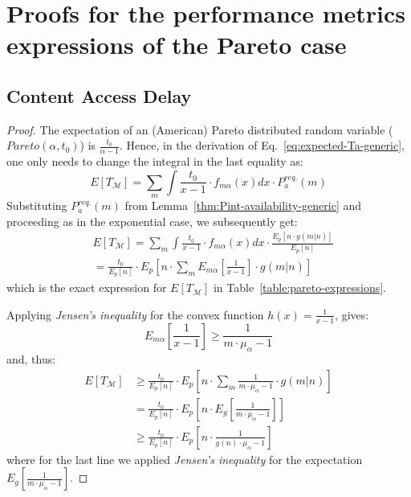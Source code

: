 \documentclass[journal]{IEEEtran}
\newcommand{\eq}[1]{Eq.~\eqref{#1}}
\begin{document}
\section{Proofs for the performance metrics expressions of the Pareto case}\label{appendix:pareto-expressions-proofs}
\subsection{Content Access Delay}
\begin{proof}
The expectation of an (American) Pareto distributed random variable ($Pareto(\alpha, t_{0})$) is $\frac{t_{0}}{\alpha-1}$. Hence, in the derivation of \eq{eq:expected-Ta-generic}, one only needs to change the integral in the last equality as:
\begin{equation}\label{eq:expected-Ta-generic-pareto}
E[T_{\mathcal{M}}] = \sum_{m} \int \frac{t_{0}}{x-1}\cdot f_{m\alpha}(x)dx \cdot P_{a}^{req.}(m)
\end{equation}
Substituting $P_{a}^{req.}(m)$ from Lemma~\ref{thm:Pint-availability-generic} and proceeding as in the exponential case, we subsequently get:
\begin{align}
&E[T_{\mathcal{M}}] = \sum_{m} \int \frac{t_{0}}{x-1}\cdot f_{m\alpha}(x)dx \cdot \frac{E_{p}[n\cdot g(m|n)]}{E_{p}[n]}\nonumber\\
&=\frac{t_{0}}{E_{p}[n]}\cdot E_{p}\left[n\cdot \sum_{m} E_{m\alpha}\left[\frac{1}{x-1}\right]\cdot g(m|n)\right]
\end{align}
which is the exact expression for $E[T_{\mathcal{M}}]$ in Table~\ref{table:pareto-expressions}.

Applying \textit{Jensen's inequality} for the convex function $h(x)=\frac{1}{x-1}$, gives:
\begin{equation}
E_{m\alpha}\left[\frac{1}{x-1}\right]\geq \frac{1}{m\cdot\mu_{\alpha}-1}
\end{equation}
and, thus:
\begin{align}
E[T_{\mathcal{M}}] &\geq \frac{t_{0}}{E_{p}[n]}\cdot E_{p}\left[n\cdot \sum_{m} \frac{1}{m\cdot\mu_{\alpha}-1}\cdot g(m|n)\right]\nonumber\\
&=\frac{t_{0}}{E_{p}[n]}\cdot E_{p}\left[n\cdot E_{g}\left[\frac{1}{m\cdot\mu_{\alpha}-1}\right]\right]\nonumber\\
&\geq \frac{t_{0}}{E_{p}[n]}\cdot E_{p}\left[n\cdot \frac{1}{\overline{g}(n)\cdot\mu_{\alpha}-1}\right]
\end{align}
where for the last line we applied \textit{Jensen's inequality} for the expectation $E_{g}\left[\frac{1}{m\cdot\mu_{\alpha}-1}\right]$.
\end{proof}
\end{document}
